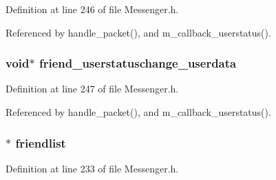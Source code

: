 Definition at line 246 of file Messenger.\+h.



Referenced by handle\+\_\+packet(), and m\+\_\+callback\+\_\+userstatus().

\hypertarget{struct_messenger_a1007bf7131bf75ddd1980ed1b610e6f7}{
\subsubsection[{friend\+\_\+userstatuschange\+\_\+userdata}]{\setlength{\rightskip}{0pt plus 5cm}void$\ast$ friend\+\_\+userstatuschange\+\_\+userdata}}\label{struct_messenger_a1007bf7131bf75ddd1980ed1b610e6f7}


Definition at line 247 of file Messenger.\+h.



Referenced by handle\+\_\+packet(), and m\+\_\+callback\+\_\+userstatus().

\hypertarget{struct_messenger_a42c185c16c5df7707ba4d70bb6ee75e7}{
\subsubsection[{friendlist}]{$\ast$ friendlist}}\label{struct_messenger_a42c185c16c5df7707ba4d70bb6ee75e7}


Definition at line 233 of file Messenger.\+h.



